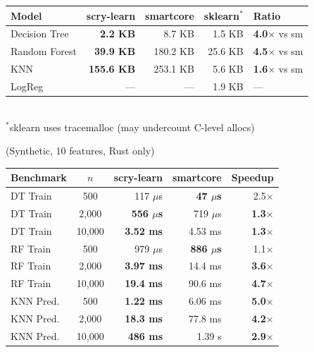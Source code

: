 \documentclass[11pt,a4paper]{article}
\newcommand{\hdr}[1]{\cellcolor{headerblue}\textbf{\color{darktext}#1}}
\newcommand{\win}[1]{\textbf{\color{wingreen}#1}}
\newcommand{\us}{$\mu$s}
\newcommand{\speedup}[1]{{\footnotesize\color{wingreen}\textbf{#1$\times$}}}
\newcommand{\slower}[1]{{\footnotesize\color{losered}#1$\times$}}
\begin{document}
\vspace{4pt}
\begin{table}[H]
\centering
\small
\setlength{\tabcolsep}{8pt}
\renewcommand{\arraystretch}{1.2}
\begin{tabular}{lrrrl}
\toprule
\rowcolor{headerblue}
\hdr{Model} & \hdr{scry-learn} & \hdr{smartcore} & \hdr{sklearn$^*$} & \hdr{Ratio} \\
\midrule
Decision Tree   & \win{2.2 KB}    & 8.7 KB    & 1.5 KB    & \speedup{4.0} vs sm \\
\rowcolor{lightgray}
Random Forest   & \win{39.9 KB}   & 180.2 KB  & 25.6 KB   & \speedup{4.5} vs sm \\
KNN             & \win{155.6 KB}  & 253.1 KB  & 5.6 KB    & \speedup{1.6} vs sm \\
\rowcolor{lightgray}
LogReg          & ---             & ---       & 1.9 KB    & --- \\
\bottomrule
\end{tabular}
\\[2pt]
{\footnotesize\color{neutralgray} $^*$sklearn uses tracemalloc (may undercount C-level allocs)}
\end{table}

 {\small\color{neutralgray}(Synthetic, 10 features, Rust only)}

\vspace{4pt}
\begin{table}[H]
\centering
\small
\setlength{\tabcolsep}{8pt}
\renewcommand{\arraystretch}{1.2}
\begin{tabular}{lcrrr}
\toprule
\rowcolor{headerblue}
\hdr{Benchmark} & \hdr{$n$} & \hdr{scry-learn} & \hdr{smartcore} & \hdr{Speedup} \\
\midrule
DT Train   & 500    & 117 \us            & \win{47 \us}    & \slower{2.5} \\
\rowcolor{lightgray}
DT Train   & 2,000  & \win{556 \us}      & 719 \us         & \speedup{1.3} \\
DT Train   & 10,000 & \win{3.52 ms}      & 4.53 ms         & \speedup{1.3} \\
\midrule
RF Train   & 500    & 979 \us            & \win{886 \us}   & \slower{1.1} \\
\rowcolor{lightgray}
RF Train   & 2,000  & \win{3.97 ms}      & 14.4 ms         & \speedup{3.6} \\
RF Train   & 10,000 & \win{19.4 ms}      & 90.6 ms         & \speedup{4.7} \\
\midrule
KNN Pred.  & 500    & \win{1.22 ms}      & 6.06 ms         & \speedup{5.0} \\
\rowcolor{lightgray}
KNN Pred.  & 2,000  & \win{18.3 ms}      & 77.8 ms         & \speedup{4.2} \\
KNN Pred.  & 10,000 & \win{486 ms}       & 1.39 s          & \speedup{2.9} \\
\bottomrule
\end{tabular}
\end{table}
\end{document}
